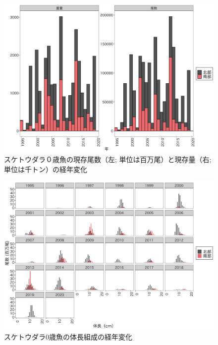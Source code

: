 \documentclass[11pt]{article} %
\begin{document}
\begin{linenumbers}
\begin{figure}[h]
  \centering
  \includegraphics[width = 14cm]{スケトウダラ０＋trend.png}
  \caption{スケトウダラ０歳魚の現存尾数（左; 単位は百万尾）と現存量（右; 単位は千トン）の経年変化}
\end{figure}

\begin{figure}[h]
  \centering
  \includegraphics[width = 14cm]{スケトウダラ0+length.png}
  \caption{スケトウダラ0歳魚の体長組成の経年変化}
\end{figure}


\end{linenumbers}
\end{document}
